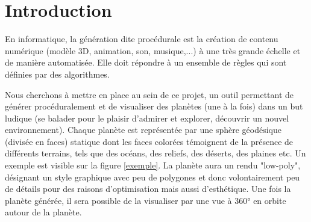 \documentclass[a4paper]{article}
\begin{document}
\begin{titlepage}






\vfill %

\end{titlepage}

\newpage

\tableofcontents

\newpage

\section{Introduction}

En informatique, la génération dite procédurale est la création de contenu numérique (modèle 3D, animation, son, musique,...) à une très grande échelle et de manière automatisée. Elle doit répondre à un ensemble de règles qui sont définies par des algorithmes.\\
\par
Nous cherchons à mettre en place au sein de ce projet, un outil permettant de générer procéduralement et de visualiser des planètes (une à la fois) dans un but ludique (se balader pour le plaisir d'admirer et explorer, découvrir un nouvel environnement). Chaque planète est représentée par une sphère géodésique (divisée en faces) statique dont les faces colorées témoignent de la présence de différents terrains, tels que des océans, des reliefs, des déserts, des plaines etc. Un exemple est visible sur la figure \ref{exemple}. La planète aura un rendu "low-poly", désignant un style graphique avec peu de polygones et donc volontairement peu de détails pour des raisons d'optimisation mais aussi d'esthétique. Une fois la planète générée, il sera possible de la visualiser par une vue à 360° en orbite autour de la planète. 
\end{document}
